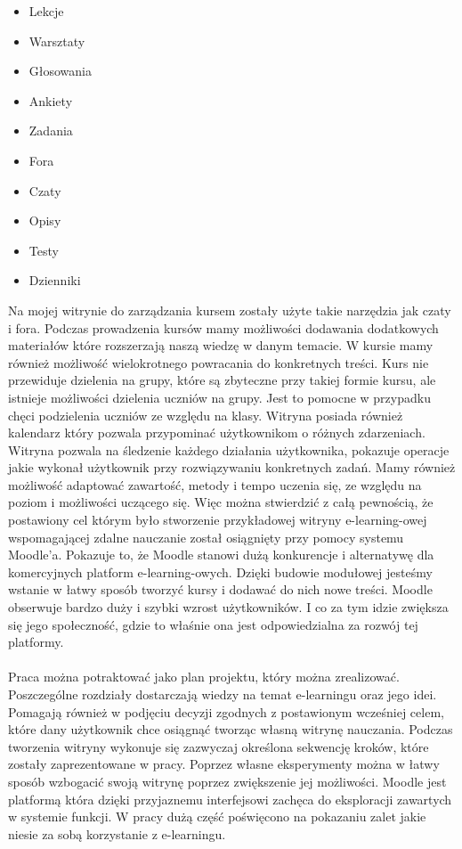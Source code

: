 \begin{itemize}
	\item Lekcje
	\item Warsztaty
	\item Głosowania
	\item Ankiety
	\item Zadania
	\item Fora
	\item Czaty
	\item Opisy
	\item Testy
	\item Dzienniki
\end{itemize}
Na mojej witrynie do zarządzania kursem zostały użyte takie narzędzia jak czaty i fora. Podczas prowadzenia kursów mamy możliwości dodawania dodatkowych materiałów które rozszerzają naszą wiedzę w danym temacie. W kursie mamy również możliwość wielokrotnego powracania do konkretnych treści. Kurs nie przewiduje dzielenia na grupy, które są zbyteczne przy takiej formie kursu, ale istnieje możliwości dzielenia uczniów na grupy. Jest to pomocne w przypadku chęci podzielenia uczniów ze względu na klasy. Witryna posiada również kalendarz który pozwala przypominać użytkownikom o różnych zdarzeniach. Witryna pozwala na śledzenie każdego działania użytkownika, pokazuje operacje jakie wykonał użytkownik przy rozwiązywaniu konkretnych zadań. Mamy również możliwość adaptować zawartość, metody i tempo uczenia się, ze względu na poziom i możliwości uczącego się. Więc można stwierdzić z całą pewnością, że postawiony cel którym było stworzenie przykładowej witryny e-learning-owej wspomagającej zdalne nauczanie został osiągnięty przy pomocy systemu Moodle'a. Pokazuje to, że Moodle stanowi dużą konkurencje i alternatywę dla komercyjnych platform e-learning-owych. Dzięki budowie modułowej jesteśmy wstanie w łatwy sposób tworzyć kursy i dodawać do nich nowe treści. Moodle obserwuje bardzo duży i szybki wzrost użytkowników. I co za tym idzie zwiększa się jego społeczność, gdzie to właśnie ona jest odpowiedzialna za rozwój tej platformy.\\
\ \\
Praca można potraktować jako plan projektu, który można zrealizować. Poszczególne rozdziały dostarczają wiedzy na temat e-learningu oraz jego idei. Pomagają również w podjęciu decyzji zgodnych z postawionym wcześniej celem, które dany użytkownik chce osiągnąć tworząc własną witrynę nauczania. Podczas tworzenia witryny wykonuje się zazwyczaj określona sekwencję kroków, które zostały zaprezentowane w pracy. Poprzez własne eksperymenty można w łatwy sposób wzbogacić swoją witrynę poprzez zwiększenie jej możliwości. Moodle jest platformą która dzięki przyjaznemu interfejsowi zachęca do eksploracji zawartych w systemie funkcji. W pracy dużą część poświęcono na pokazaniu zalet jakie niesie za sobą korzystanie z e-learningu. \\
